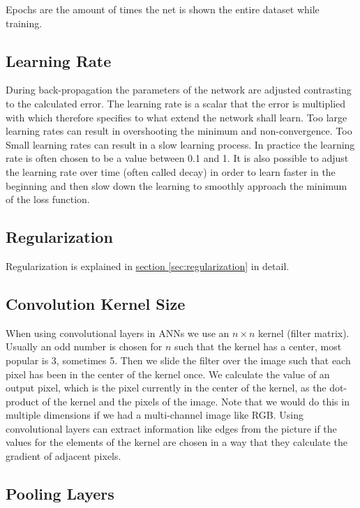 Epochs are the amount of times the net is shown the entire dataset while training.

\subsection{Learning Rate}

During back-propagation the parameters of the network are adjusted contrasting to the calculated error. The learning rate is a scalar that the error is multiplied with which therefore specifies to what extend the network shall learn. Too large learning rates can result in overshooting the minimum and non-convergence. Too Small learning rates can result in a slow learning process. In practice the learning rate is often chosen to be a value between 0.1 and 1. It is also possible to adjust the learning rate over time (often called decay) in order to learn faster in the beginning and then slow down the learning to smoothly approach the minimum of the loss function.

\subsection{Regularization}

Regularization is explained in \hyperref[sec:regularization]{section \ref*{sec:regularization}} in detail.

\subsection{Convolution Kernel Size}

When using convolutional layers in ANNs we use an $n \times n$ kernel (filter matrix). Usually an odd number is chosen for $n$ such that the kernel has a center, most popular is 3, sometimes 5. Then we slide the filter over the image such that each pixel has been in the center of the kernel once. We calculate the value of an output pixel, which is the pixel currently in the center of the kernel, as the dot-product of the kernel and the pixels of the image. Note that we would do this in multiple dimensions if we had a multi-channel image like RGB. Using convolutional layers can extract information like edges from the picture if the values for the elements of the kernel are chosen in a way that they calculate the gradient of adjacent pixels.

\subsection{Pooling Layers}

